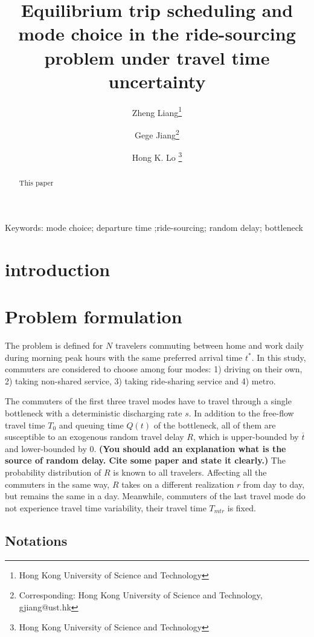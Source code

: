 \documentclass[a4paper,11pt]{article}
\begin{document}
\title{Equilibrium trip scheduling and mode choice in the ride-sourcing problem under travel time uncertainty }
\author{Zheng Liang\thanks{Hong Kong University of Science and Technology}
\and
Gege Jiang\thanks{Corresponding: Hong Kong University of Science and Technology, gjiang@ust.hk}
\and
Hong K. Lo \thanks{Hong Kong University of Science and Technology}}
\maketitle

\begin{abstract}
This paper 
\end{abstract}

\noindent Keywords: mode choice; departure time ;ride-sourcing; random delay; bottleneck

\bigskip
\section{introduction}
\section{Problem formulation}\label{sec:model}

The problem is defined for $N$ travelers commuting between home and work daily during morning peak hours with the same preferred arrival time $t^*$. In this study, commuters are considered to choose among four modes: 1) driving on their own, 2) taking non-shared service, 3) taking ride-sharing service and 4) metro. 

The commuters of the first three travel modes have to travel through a single bottleneck with a deterministic discharging rate $s$. In addition to the free-flow travel time $T_0$ and queuing time $Q(t)$ of the bottleneck, all of them are susceptible to an exogenous random travel delay $R$, which is upper-bounded by $\overline{t}$ and lower-bounded by $0$.
\textbf{(You should add an explanation what is the source of random delay. Cite some paper and state it clearly.)} The probability distribution of $R$ is known to all travelers. Affecting all the commuters in the same way, $R$ takes on a different realization $r$ from day to day, but remains the same in a day. Meanwhile, commuters of the last travel mode do not experience travel time variability, their travel time $T_{mtr}$ is fixed.

\subsection{Notations} \label{subs:notation}
\end{document}
